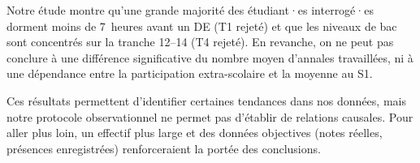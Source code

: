 Notre étude montre qu'une grande majorité des étudiant·es interrogé·es dorment
moins de 7~heures avant un DE (T1 rejeté) et que les niveaux de bac sont
concentrés sur la tranche 12--14 (T4 rejeté). En revanche, on ne peut pas
conclure à une différence significative du nombre moyen d'annales travaillées,
ni à une dépendance entre la participation extra-scolaire et la moyenne au S1.

Ces résultats permettent d'identifier certaines tendances dans nos données, mais
notre protocole observationnel ne permet pas d'établir de relations causales.
Pour aller plus loin, un effectif plus large et des données objectives
(notes réelles, présences enregistrées) renforceraient la portée des conclusions.
